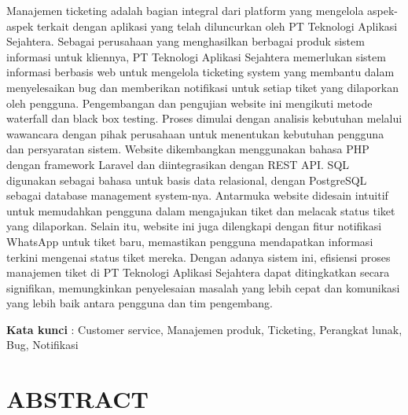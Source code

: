 \documentclass[12pt]{article}
\begin{document}
\noindent Manajemen ticketing adalah bagian integral dari platform yang mengelola aspek-aspek terkait dengan aplikasi yang telah diluncurkan oleh PT Teknologi Aplikasi Sejahtera. Sebagai perusahaan yang menghasilkan berbagai produk sistem informasi untuk kliennya, PT Teknologi Aplikasi Sejahtera memerlukan sistem informasi berbasis web untuk mengelola ticketing system yang membantu dalam menyelesaikan bug dan memberikan notifikasi untuk setiap tiket yang dilaporkan oleh pengguna. Pengembangan dan pengujian website ini mengikuti metode waterfall dan black box testing. Proses dimulai dengan analisis kebutuhan melalui wawancara dengan pihak perusahaan untuk menentukan kebutuhan pengguna dan persyaratan sistem. Website dikembangkan menggunakan bahasa PHP dengan framework Laravel dan diintegrasikan dengan REST API. SQL digunakan sebagai bahasa untuk basis data relasional, dengan PostgreSQL sebagai database management system-nya. Antarmuka website didesain intuitif untuk memudahkan pengguna dalam mengajukan tiket dan melacak status tiket yang dilaporkan. Selain itu, website ini juga dilengkapi dengan fitur notifikasi WhatsApp untuk tiket baru, memastikan pengguna mendapatkan informasi terkini mengenai status tiket mereka. Dengan adanya sistem ini, efisiensi proses manajemen tiket di PT Teknologi Aplikasi Sejahtera dapat ditingkatkan secara signifikan, memungkinkan penyelesaian masalah yang lebih cepat dan komunikasi yang lebih baik antara pengguna dan tim pengembang.

\vspace*{1cm}
\noindent \textbf{Kata kunci} : Customer service, Manajemen produk, Ticketing, Perangkat lunak, Bug, Notifikasi

\newpage

\section*{ABSTRACT}
\end{document}
